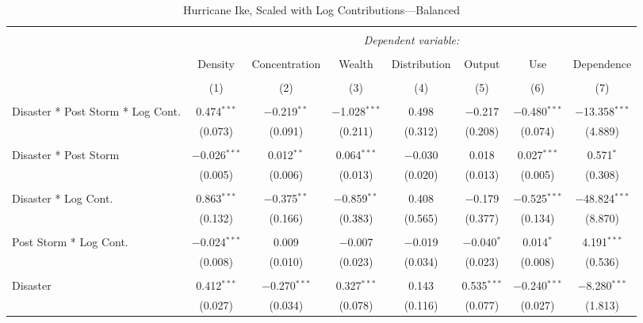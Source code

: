 
\begin{table}[!htbp] \centering 
  \caption{Hurricane Ike, Scaled with Log Contributions---Balanced} 
  \label{} 
\footnotesize 
\begin{tabular}{@{\extracolsep{5pt}}lccccccc} 
\\[-1.8ex]\hline 
\hline \\[-1.8ex] 
 & \multicolumn{7}{c}{\textit{Dependent variable:}} \\ 
\cline{2-8} 
\\[-1.8ex] & Density & Concentration & Wealth & Distribution & Output & Use & Dependence \\ 
\\[-1.8ex] & (1) & (2) & (3) & (4) & (5) & (6) & (7)\\ 
\hline \\[-1.8ex] 
 Disaster * Post Storm * Log Cont. & 0.474$^{***}$ & $-$0.219$^{**}$ & $-$1.028$^{***}$ & 0.498 & $-$0.217 & $-$0.480$^{***}$ & $-$13.358$^{***}$ \\ 
  & (0.073) & (0.091) & (0.211) & (0.312) & (0.208) & (0.074) & (4.889) \\ 
  & & & & & & & \\ 
 Disaster * Post Storm & $-$0.026$^{***}$ & 0.012$^{**}$ & 0.064$^{***}$ & $-$0.030 & 0.018 & 0.027$^{***}$ & 0.571$^{*}$ \\ 
  & (0.005) & (0.006) & (0.013) & (0.020) & (0.013) & (0.005) & (0.308) \\ 
  & & & & & & & \\ 
 Disaster * Log Cont. & 0.863$^{***}$ & $-$0.375$^{**}$ & $-$0.859$^{**}$ & 0.408 & $-$0.179 & $-$0.525$^{***}$ & $-$48.824$^{***}$ \\ 
  & (0.132) & (0.166) & (0.383) & (0.565) & (0.377) & (0.134) & (8.870) \\ 
  & & & & & & & \\ 
 Post Storm *  Log Cont. & $-$0.024$^{***}$ & 0.009 & $-$0.007 & $-$0.019 & $-$0.040$^{*}$ & 0.014$^{*}$ & 4.191$^{***}$ \\ 
  & (0.008) & (0.010) & (0.023) & (0.034) & (0.023) & (0.008) & (0.536) \\ 
  & & & & & & & \\ 
 Disaster & 0.412$^{***}$ & $-$0.270$^{***}$ & 0.327$^{***}$ & 0.143 & 0.535$^{***}$ & $-$0.240$^{***}$ & $-$8.280$^{***}$ \\ 
  & (0.027) & (0.034) & (0.078) & (0.116) & (0.077) & (0.027) & (1.813) \\ 

\end{tabular}
\end{table}
